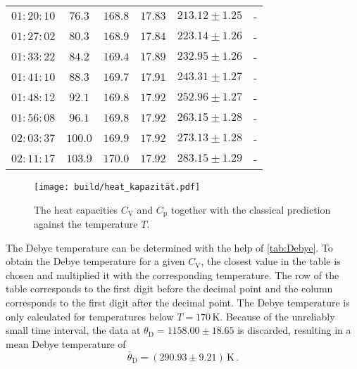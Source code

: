 \begin{table}[H]
\begin{tabular}{c c c c c c}
          $01:20:10$  &  $76.3$ &    $168.8$ &   $ 17.83$  & $213.12 \pm 1.25$&-                       \\    
          $01:27:02$  &  $80.3$ &    $168.9$ &   $ 17.84$  & $223.14 \pm 1.26$&-                       \\    
          $01:33:22$  &  $84.2$ &    $169.4$ &   $ 17.89$  & $232.95 \pm 1.26$&-                       \\    
          $01:41:10$  &  $88.3$ &    $169.7$ &   $ 17.91$  & $243.31 \pm 1.27$&-                       \\    
          $01:48:12$  &  $92.1$ &    $169.8$ &   $ 17.92$  & $252.96 \pm 1.27$&-                       \\    
          $01:56:08$  &  $96.1$ &    $169.8$ &   $ 17.92$  & $263.15 \pm 1.28$&-                       \\    
          $02:03:37$  &  $100.0$&    $169.9$ &   $ 17.92$  & $273.13 \pm 1.28$&-                       \\   
          $02:11:17$  &  $103.9$&    $170.0$ &   $ 17.92$  & $283.15 \pm 1.29$&-                       \\   
    \bottomrule
    \end{tabular}
    \end{table}

\begin{figure}[H]
    \centering
    \texttt{[image: build/heat\_kapazität.pdf]}
    \caption{The heat capacities $C_\text{V}$ and $C_\text{p}$ together with the classical prediction against the temperature $T$.}
    \label{fig:heat_cap_plot}
\end{figure}

The Debye temperature can be determined with the help of \autoref{tab:Debye}.
To obtain the Debye temperature for a given $C_\text{V}$, the closest value in the table is chosen and multiplied it with the corresponding temperature.
The row of the table corresponds to the first digit before the decimal point and the column corresponds
to the first digit after the decimal point. 
The Debye temperature is only calculated for temperatures below $T = 170 \, \unit{\kelvin}$.
Because of the unreliably small time interval, the data at $\theta_\text{D} = 1158.00\pm 18.65$ is discarded,
resulting in a mean Debye temperature of 
\begin{equation*}
    \bar{\theta}_\text{D} = \left( 290.93 \pm  9.21 \right) \,  \unit{\kelvin} \,.
\end{equation*}

